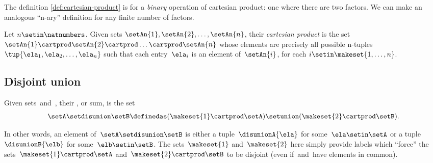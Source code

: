 The definition \cref{def:cartesian-product} is for a \emph{binary} operation of cartesian product: one where there are two factors. We can make an analogous ``n-ary'' definition for any finite number of factors.

\begin{ctdefinition}
    \label{def:n-ary-cartesian-product}
    Let $n \setin \natnumbers$. Given sets $\setAn{1}, \setAn{2}, \dots, \setAn{n}$, their \emph{cartesian product} is the set $\setAn{1} \cartprod \setAn{2} \cartprod \dots \cartprod \setAn{n}$ whose elements are precisely all possible n-tuples~$\tup{\ela_{1}, \ela_{2}, \dots, \ela_{n}}$ such that each entry~$\ela_{i}$ is an element of~$\setAn{i}$, for each $i \setin \makeset{1, \dots, n}$.
\end{ctdefinition}


\subsection{Disjoint union}
\label{sec:disjoint-union}

\begin{ctdefinition}
    \label{def:disjoint-union-of-sets}
    Given sets~\setA and~\setB, their , or sum, is the set
    \begin{equation}
        \setA \setdisunion \setB \definedas ( \makeset{ 1 } \cartprod \setA) \setunion ( \makeset{2} \cartprod \setB).
    \end{equation}
\end{ctdefinition}
In other words, an element of~$\setA \setdisunion \setB$ is either a tuple~$\disunionA{\ela}$ for some~$\ela \setin\setA$ or a tuple $\disunionB{\elb}$ for some~$\elb \setin\setB$.
The sets~$\makeset{ 1 }$ and~$\makeset{2}$ here simply provide labels which ``force'' the sets~$\makeset{ 1 } \cartprod \setA$ and~$ \makeset{2} \cartprod \setB$ to be disjoint (even if~\setA and~\setB have elements in common).



